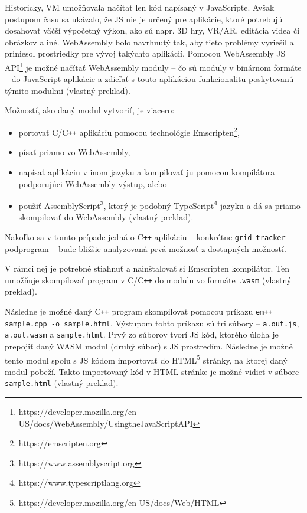 Historicky, VM umožňovala načítať len kód napísaný v JavaScripte. Avšak postupom času sa ukázalo, že JS nie je určený pre aplikácie, ktoré potrebujú dosahovať väčší výpočetný výkon, ako sú napr. 3D hry, VR/AR, editácia videa či obrázkov a iné.
WebAssembly bolo navrhnutý tak, aby tieto problémy vyriešil a priniesol prostriedky pre vývoj takýchto aplikácií. 
Pomocou WebAssembly JS API\footnote{https://developer.mozilla.org/en-US/docs/WebAssembly/Using\textunderscore the\textunderscore JavaScript\textunderscore API} je možné načítať WebAssembly moduly -- čo sú moduly v binárnom formáte -- do JavaScript aplikácie a zdieľať s touto aplikáciou funkcionalitu poskytovanú týmito modulmi \cite{webassembly_concepts} (vlastný preklad).

Možností, ako daný modul vytvoriť, je viacero:
\begin {itemize}
\item {portovať C/C\texttt{++} aplikáciu pomocou technológie Emscripten\footnote{https://emscripten.org},}
\item {písať priamo vo WebAssembly,}
\item {napísať aplikáciu v inom jazyku a kompilovať ju pomocou kompilátora podporujúci WebAssembly výstup, alebo}
\item {použiť AssemblyScript\footnote{https://www.assemblyscript.org}, ktorý je podobný TypeScript\footnote{https://www.typescriptlang.org} jazyku a dá sa priamo skompilovať do WebAssembly  \cite{webassembly_concepts} (vlastný preklad).}
\end {itemize}

Nakoľko sa v tomto prípade jedná o C\texttt{++} aplikáciu -- konkrétne \texttt{grid-tracker} podprogram -- bude bližšie analyzovaná prvá možnosť z dostupných možností.

V rámci nej je potrebné stiahnuť a nainštalovať si Emscripten kompilátor. Ten umožňuje skompilovať program v C/C\texttt{++} do modulu vo formáte \texttt{.wasm} \cite{cpp_to_wasm} (vlastný preklad).

Následne je možné daný C\texttt{++} program skompilovať pomocou príkazu \texttt{em++ sample.cpp -o sample.html}. Výstupom tohto príkazu sú tri súbory -- \newline \texttt{a.out.js}, \texttt{a.out.wasm} a \texttt{sample.html}. Prvý zo súborov tvorí JS kód, ktorého úloha je prepojiť daný WASM modul (druhý súbor) s JS prostredím. Následne je možné tento modul spolu s JS kódom importovať do HTML\footnote{https://developer.mozilla.org/en-US/docs/Web/HTML} stránky, na ktorej daný modul pobeží. Takto importovaný kód v HTML stránke je možné vidieť v súbore \texttt{sample.html} \cite{cpp_to_wasm} (vlastný preklad).

